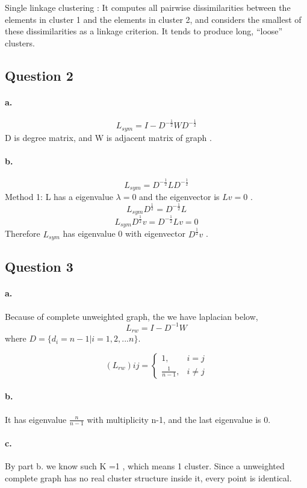 \documentclass{article}
\begin{document}
Single linkage clustering : It computes all pairwise dissimilarities between the elements in cluster 1 and the elements in cluster 2, and considers the smallest of these dissimilarities as a linkage criterion.
 It tends to produce long, “loose” clusters.

 \subsection*{Question 2}
\paragraph{a.}
$$ L_{sym}  = I  - D^{-\frac{1}{2}} W D^{-\frac{1}{2}}$$
D is degree matrix, and W is adjacent matrix of graph .
\paragraph{b.}
$$ L_{sym}  = D^{-\frac{1}{2}} L D^{-\frac{1}{2}}$$
Method 1: L has a eigenvalue $ \lambda = 0$ and the eigenvector is $ Lv=0 $ .
$$ L_{sym} D^{\frac{1}{2}} = D^{-\frac{1}{2}} L $$
$$ L_{sym} D^{\frac{1}{2}}v = D^{-\frac{1}{2}} Lv = 0$$
Therefore $ L_{sym} $ has eigenvalue 0 with eigenvector $D^{\frac{1}{2}}v$ .


\subsection*{Question 3}
\paragraph{a.}

Because of complete unweighted graph, the we have laplacian below,
$$ L_{rw}  = I  - D^{-1} W $$
where $D = \{d_i = n-1 | i = 1, 2, ... n\}$.

\begin{equation}
  (L_{rw})ij =
  \begin{cases}
    1, &i =j  \\
    \frac{1}{n-1}, &i \neq j
  \end{cases}
\end{equation}


\paragraph{b.}
It has eigenvalue $\frac{n}{n-1}$ with multiplicity n-1, and the last eigenvalue is 0.


\paragraph{c.}
By part b. we know such K =1 , which means 1 cluster.  Since a unweighted complete graph has no real cluster structure
inside it, every point is identical.
\end{document}
